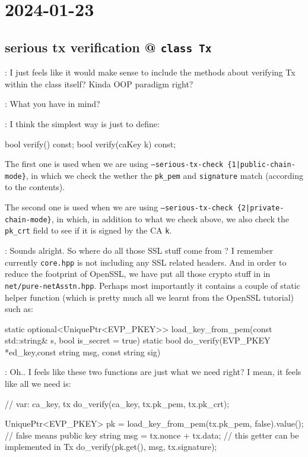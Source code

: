 
\section*{2024-01-23}

\subsection*{serious tx verification @ \texttt{class Tx} }
 : I just feels like it would make sense to include the methods
about verifying Tx within the class  itself? Kinda OOP paradigm right?

 : What you have in mind?

 : I think the simplest way is just to define:

\begin{simplec}
bool verify() const;
bool verify(caKey k) const;
\end{simplec}

The first one is used when we are using \texttt{--serious-tx-check
  \{1|public-chain-mode\}}, in which we check the wether the \texttt{pk\_pem}
and \texttt{signature} match (according to the contents).

The second one is used when we are using \texttt{--serious-tx-check
  \{2|private-chain-mode\}}, in which, in addition to what we check above, we
also check the \texttt{pk\_crt} field to see if it is signed by the CA \texttt{k}.

 : Sounds alright. So where do all those SSL stuff come from ? I
remember currently \texttt{core.hpp} is not including any SSL related headers.
And in order to reduce the footprint of OpenSSL, we have put all those crypto
stuff in  in \texttt{net/pure-netAsstn.hpp}. Perhaps most
importantly it contains a couple of static helper function (which is pretty much
all we learnt from the OpenSSL tutorial) such as:
\begin{simplec}
static optional<UniquePtr<EVP_PKEY>> load_key_from_pem(const std::string& s, bool is_secret = true)
static bool do_verify(EVP_PKEY *ed_key,const string msg, const string sig)
\end{simplec}

 : Oh.. I feels like these two functions are just what we need
right? I mean, it feels like all we need is:

\begin{simplec}
// var: ca_key, tx
do_verify(ca_key, tx.pk_pem, tx.pk_crt);

UniquePtr<EVP_PKEY> pk = load_key_from_pem(tx.pk_pem, false).value(); // false means public key
string msg = tx.nonce + tx.data; // this getter can be implemented in Tx
do_verify(pk.get(), msg, tx.signature);
\end{simplec}

